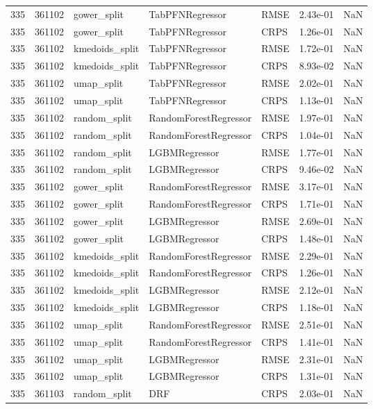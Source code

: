 \begin{tabular}{rrlllrr}
335 & 361102 & gower\_split & TabPFNRegressor & RMSE & 2.43e-01 & NaN \\
335 & 361102 & gower\_split & TabPFNRegressor & CRPS & 1.26e-01 & NaN \\
335 & 361102 & kmedoids\_split & TabPFNRegressor & RMSE & 1.72e-01 & NaN \\
335 & 361102 & kmedoids\_split & TabPFNRegressor & CRPS & 8.93e-02 & NaN \\
335 & 361102 & umap\_split & TabPFNRegressor & RMSE & 2.02e-01 & NaN \\
335 & 361102 & umap\_split & TabPFNRegressor & CRPS & 1.13e-01 & NaN \\
335 & 361102 & random\_split & RandomForestRegressor & RMSE & 1.97e-01 & NaN \\
335 & 361102 & random\_split & RandomForestRegressor & CRPS & 1.04e-01 & NaN \\
335 & 361102 & random\_split & LGBMRegressor & RMSE & 1.77e-01 & NaN \\
335 & 361102 & random\_split & LGBMRegressor & CRPS & 9.46e-02 & NaN \\
335 & 361102 & gower\_split & RandomForestRegressor & RMSE & 3.17e-01 & NaN \\
335 & 361102 & gower\_split & RandomForestRegressor & CRPS & 1.71e-01 & NaN \\
335 & 361102 & gower\_split & LGBMRegressor & RMSE & 2.69e-01 & NaN \\
335 & 361102 & gower\_split & LGBMRegressor & CRPS & 1.48e-01 & NaN \\
335 & 361102 & kmedoids\_split & RandomForestRegressor & RMSE & 2.29e-01 & NaN \\
335 & 361102 & kmedoids\_split & RandomForestRegressor & CRPS & 1.26e-01 & NaN \\
335 & 361102 & kmedoids\_split & LGBMRegressor & RMSE & 2.12e-01 & NaN \\
335 & 361102 & kmedoids\_split & LGBMRegressor & CRPS & 1.18e-01 & NaN \\
335 & 361102 & umap\_split & RandomForestRegressor & RMSE & 2.51e-01 & NaN \\
335 & 361102 & umap\_split & RandomForestRegressor & CRPS & 1.41e-01 & NaN \\
335 & 361102 & umap\_split & LGBMRegressor & RMSE & 2.31e-01 & NaN \\
335 & 361102 & umap\_split & LGBMRegressor & CRPS & 1.31e-01 & NaN \\
335 & 361103 & random\_split & DRF & CRPS & 2.03e-01 & NaN \\

\end{tabular}
